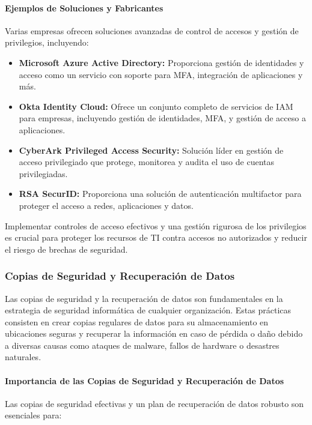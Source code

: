 \paragraph{Ejemplos de Soluciones y Fabricantes}

Varias empresas ofrecen soluciones avanzadas de control de accesos y gestión de privilegios, incluyendo:

\begin{itemize}
    \item \textbf{Microsoft Azure Active Directory:} Proporciona gestión de identidades y acceso como un servicio con soporte para MFA, integración de aplicaciones y más.
    \item \textbf{Okta Identity Cloud:} Ofrece un conjunto completo de servicios de IAM para empresas, incluyendo gestión de identidades, MFA, y gestión de acceso a aplicaciones.
    \item \textbf{CyberArk Privileged Access Security:} Solución líder en gestión de acceso privilegiado que protege, monitorea y audita el uso de cuentas privilegiadas.
    \item \textbf{RSA SecurID:} Proporciona una solución de autenticación multifactor para proteger el acceso a redes, aplicaciones y datos.
\end{itemize}

Implementar controles de acceso efectivos y una gestión rigurosa de los privilegios es crucial para proteger los recursos de TI contra accesos no autorizados y reducir el riesgo de brechas de seguridad.


\subsubsection{Copias de Seguridad y Recuperación de Datos}

Las copias de seguridad y la recuperación de datos son fundamentales en la estrategia de seguridad informática de cualquier organización. Estas prácticas consisten en crear copias regulares de datos para su almacenamiento en ubicaciones seguras y recuperar la información en caso de pérdida o daño debido a diversas causas como ataques de malware, fallos de hardware o desastres naturales.

\paragraph{Importancia de las Copias de Seguridad y Recuperación de Datos}

Las copias de seguridad efectivas y un plan de recuperación de datos robusto son esenciales para:

